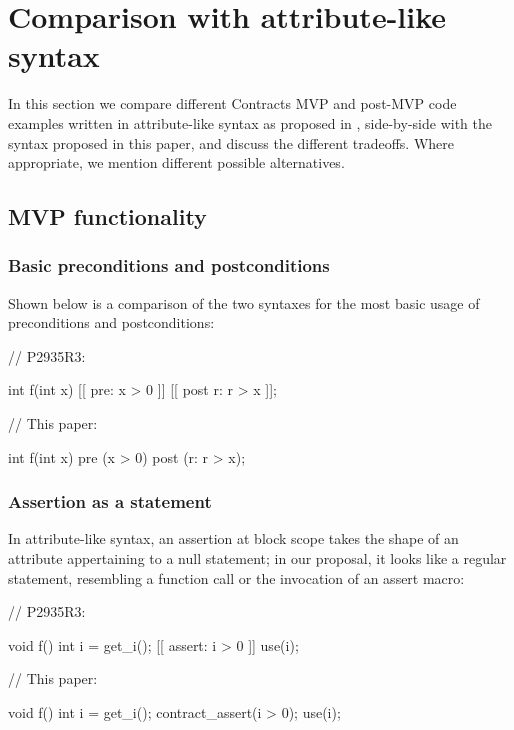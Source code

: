
\section{Comparison with attribute-like syntax}

In this section we compare different Contracts MVP and post-MVP code examples written in attribute-like syntax as proposed in \cite{P2935R3}, side-by-side with the syntax proposed in this paper, and discuss the different tradeoffs. Where appropriate, we mention different possible alternatives.

\subsection{MVP functionality}

\subsubsection{Basic preconditions and postconditions}
Shown below is a comparison of the two syntaxes for the most basic usage of preconditions and postconditions:

\begin{minipage}{8cm}
\begin{codeblock}
// P2935R3:

int f(int x) 
  [[ pre: x > 0 ]]
  [[ post r: r > x ]];
\end{codeblock}
\end{minipage}
\begin{minipage}{8cm}
\begin{codeblock}
// This paper:

int f(int x) 
  pre (x > 0)
  post (r: r > x);
\end{codeblock}
\end{minipage}

\subsubsection{Assertion as a statement}

In attribute-like syntax, an assertion at block scope takes the shape of an attribute appertaining to a null statement; in our proposal, it looks like a regular statement, resembling a function call or the invocation of an assert macro:
\vspace{5mm}

\begin{minipage}{8cm}
\begin{codeblock}
// P2935R3:

void f() {
  int i = get_i();
  [[ assert: i > 0 ]]
  use(i);
}
\end{codeblock}
\end{minipage}
\begin{minipage}{8cm}
\begin{codeblock}
// This paper:

void f() {
  int i = get_i();
  contract_assert(i > 0);
  use(i);
}
\end{codeblock}
\end{minipage}


